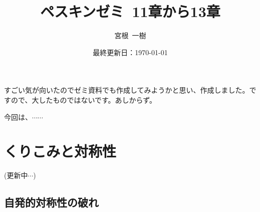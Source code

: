 \documentclass[unicode,a4paper,11pt]{ltjsarticle}
\title{
  ペスキンゼミ\ 11章から13章
}
\author{
  宮根\ 一樹
}
\date{最終更新日：\today}
\theoremstyle{definition}
\begin{document}
\maketitle
\tableofcontents

\vspace*{10pt}

すごい気が向いたのでゼミ資料でも作成してみようかと思い、作成しました。ですので、大したものではないです。あしからず。

今回は、$\cdots\cdots$


\clearpage
\setcounter{section}{10}
\section{くりこみと対称性}

(更新中$\cdots$)

\subsection{自発的対称性の破れ}
\end{document}
